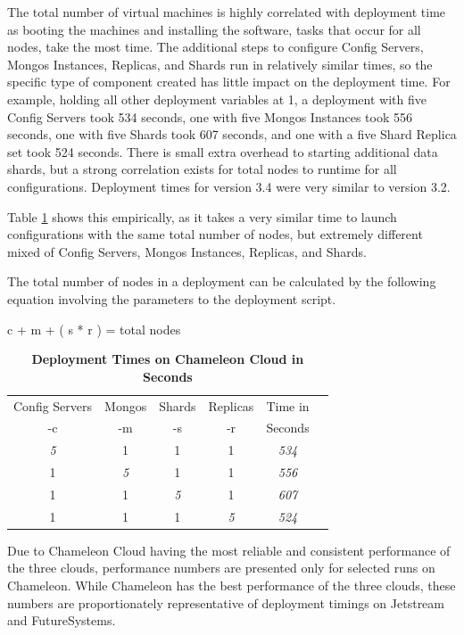 \documentclass[9pt,twocolumn,twoside]{../../styles/osajnl}
\begin{document}
The total number of virtual machines is highly correlated with deployment time as booting the machines and installing the software, tasks that occur for all nodes, take the most time.  The additional steps to configure Config Servers, Mongos Instances, Replicas, and Shards run in relatively similar times, so the specific type of component created has little impact on the deployment time.  For example, holding all other deployment variables at 1, a deployment with five Config Servers took 534 seconds, one with five Mongos Instances took 556 seconds, one with five Shards took 607 seconds, and one with a five Shard Replica set took 524 seconds.  There is small extra overhead to starting additional data shards, but a strong correlation exists for total nodes to runtime for all configurations.  Deployment times for version 3.4 were very similar to version 3.2.

Table \ref{tab:deploy-times2} shows this empirically, as it takes a very similar time to launch configurations with the same total number of nodes, but extremely different mixed of Config Servers, Mongos Instances, Replicas, and Shards.

The total number of nodes in a deployment can be calculated by the following equation involving the parameters to the deployment script.

c + m + ( s * r ) = total nodes

\begin{table}[htbp]
\centering
\caption{\bf Deployment Times on Chameleon Cloud in Seconds}

 \begin{tabular}{| c | c | c | c | c | c |} 
 \hline
Config Servers &  Mongos & Shards & Replicas & Time in \\
-c &  -m & -s & -r & Seconds
\\ [0.5ex] 
 \hline
 \hline
\emph{5} & 1 & 1 & 1 & \emph{534} \\
 \hline
 1 & \emph{5}  & 1 & 1 & \emph{556} \\
 \hline
 1 & 1 & \emph{5} & 1 & \emph{607} \\
 \hline
 1 & 1 & 1 & \emph{5}  & \emph{524}  \\ [1ex] 
 \hline
\end{tabular}
  \label{tab:deploy-times2}
\end{table}

Due to Chameleon Cloud having the most reliable and consistent performance of the three clouds, performance numbers are presented only for selected runs on Chameleon.  While Chameleon has the best performance of the three clouds, these numbers are proportionately representative of deployment timings on Jetstream and FutureSystems.
\end{document}
